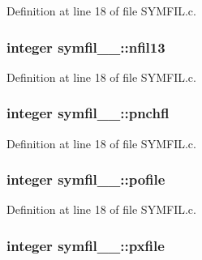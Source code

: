 Definition at line 18 of file S\+Y\+M\+F\+I\+L.\+c.

\subsubsection[{\texorpdfstring{nfil13}{nfil13}}]{\setlength{\rightskip}{0pt plus 5cm}integer symfil\+\_\+\_\+\+::nfil13}\hypertarget{structsymfil__1___a73ff15df000236c1178ce042b7f06cda}{}\label{structsymfil__1___a73ff15df000236c1178ce042b7f06cda}


Definition at line 18 of file S\+Y\+M\+F\+I\+L.\+c.

\subsubsection[{\texorpdfstring{pnchfl}{pnchfl}}]{\setlength{\rightskip}{0pt plus 5cm}integer symfil\+\_\+\_\+\+::pnchfl}\hypertarget{structsymfil__1___ae7aa9085413c6e8d876e4fc5323d0767}{}\label{structsymfil__1___ae7aa9085413c6e8d876e4fc5323d0767}


Definition at line 18 of file S\+Y\+M\+F\+I\+L.\+c.

\subsubsection[{\texorpdfstring{pofile}{pofile}}]{\setlength{\rightskip}{0pt plus 5cm}integer symfil\+\_\+\_\+\+::pofile}\hypertarget{structsymfil__1___a9436e5c881175ad1541c9d1258b2acb7}{}\label{structsymfil__1___a9436e5c881175ad1541c9d1258b2acb7}


Definition at line 18 of file S\+Y\+M\+F\+I\+L.\+c.

\subsubsection[{\texorpdfstring{pxfile}{pxfile}}]{\setlength{\rightskip}{0pt plus 5cm}integer symfil\+\_\+\_\+\+::pxfile}\hypertarget{structsymfil__1___ac5b3109516e632236038df08884d485e}{}\label{structsymfil__1___ac5b3109516e632236038df08884d485e}


